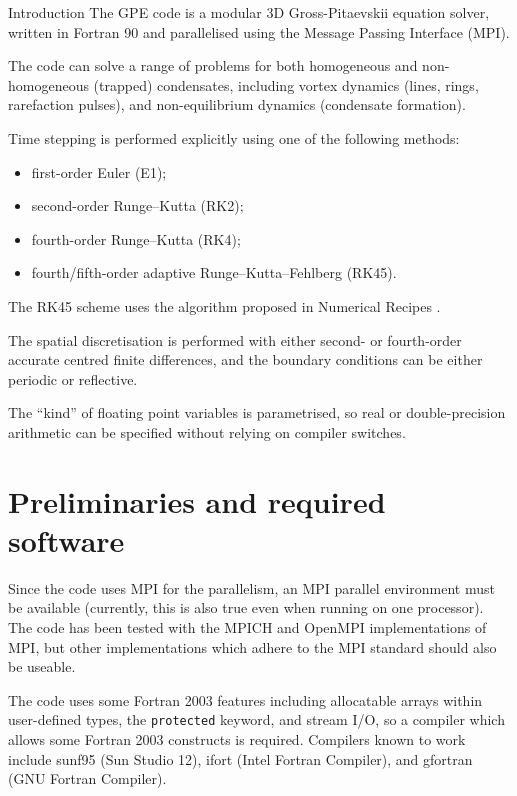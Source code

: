 
\begin{chapter}{\label{cha:introduction}Introduction}
  The GPE code is a modular 3D Gross-Pitaevskii equation solver, written in
  Fortran 90 and parallelised using the Message Passing Interface (MPI).
  
  The code can solve a range of problems for both homogeneous and
  non-homogeneous (trapped) condensates, including vortex dynamics (lines,
  rings, rarefaction pulses), and non-equilibrium dynamics (condensate
  formation).

  Time stepping is performed explicitly using one of the following methods:
  \begin{itemize}
    \item first-order Euler (E1);
    \item second-order Runge--Kutta (RK2);
    \item fourth-order Runge--Kutta (RK4);
    \item fourth/fifth-order adaptive Runge--Kutta--Fehlberg (RK45).
  \end{itemize}
  The RK45 scheme uses the algorithm proposed in Numerical Recipes
  \citep[\S 16.2, p.708,][]{NR92}.
  
  The spatial discretisation is performed with either second- or fourth-order
  accurate centred finite differences, and the boundary conditions can be
  either periodic or reflective.

  The ``kind'' of floating point variables is parametrised, so real or
  double-precision arithmetic can be specified without relying on compiler
  switches.

  \section{\label{sec:prelim}Preliminaries and required software}
  Since the code uses MPI for the parallelism, an MPI parallel environment must
  be available (currently, this is also true even when running on one
  processor).  The code has been tested with the MPICH and OpenMPI
  implementations of MPI, but other implementations which adhere to the MPI
  standard should also be useable.

  The code uses some Fortran 2003 features including allocatable arrays within
  user-defined types, the \verb"protected" keyword, and stream I/O, so a
  compiler which allows some Fortran 2003 constructs is required.  Compilers
  known to work include sunf95 (Sun Studio 12), ifort (Intel Fortran Compiler),
  and gfortran (GNU Fortran Compiler).


\end{chapter}
